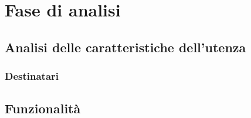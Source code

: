 \newpage
\section{Fase di analisi}
\subsection{Analisi delle caratteristiche dell'utenza}
\subsubsection{Destinatari}
\subsection{Funzionalità}

\newpage